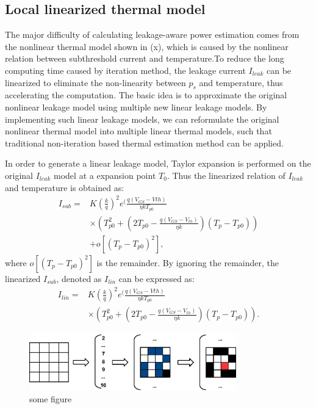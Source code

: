 \subsection{Local linearized thermal model}
The major difficulty of calculating leakage-aware power estimation comes from the nonlinear thermal model shown in (x), which is caused by the nonlinear relation between subthreshold current and temperature.To reduce the long computing time caused by iteration method, the leakage current $I_{leak}$ can be linearized to eliminate the non-linearity between $p_{s}$ and temperature, thus accelerating the computation. The basic idea is to approximate the original nonlinear leakage model using multiple new linear leakage models. By implementing such linear leakage models, we can reformulate the original nonlinear thermal model into multiple linear thermal models, such that traditional non-iteration based thermal estimation method can be applied.

In order to generate a linear leakage model, Taylor expansion is performed on the original $I_{leak}$ model at a expansion point $T_{0}$. Thus the linearized relation of $I_{leak}$ and temperature is obtained as:
\begin{equation}\label{linear_subthreshold}
\begin{split}
I_{sub} = &K(\frac{k}{q})^{2}e^(\frac{q(V_{GS}-V{th})}{\eta kT_{p0}}\\
&\times (T_{p0}^{2}+(2T_{p0}-\frac{q(V_{GS}-V_{th})}{\eta k})(T_{p}-T_{p0}))\\
&+ o[(T_{p}-T_{p0})^{2}],
\end{split}
\end{equation}
where $o[(T_{p}-T_{p0})^{2}]$ is the remainder. By ignoring the remainder, the linearized $I_{sub}$, denoted as $I_{lin}$ can be expressed as:
\begin{equation}\label{linear_subthreshold}
\begin{split}
I_{lin} = &K(\frac{k}{q})^{2}e^(\frac{q(V_{GS}-V{th})}{\eta kT_{p0}}\\
&\times (T_{p0}^{2}+(2T_{p0}-\frac{q(V_{GS}-V_{th})}{\eta k})(T_{p}-T_{p0})).
\end{split}
\end{equation}


\begin{figure}[htb]
\centering
\includegraphics[width=0.8\textwidth]{fig/greedy_method.eps}
\caption{some figure}
\end{figure}


